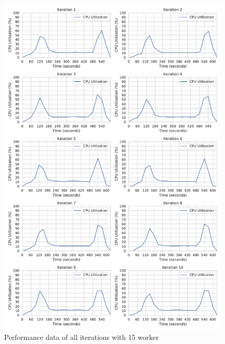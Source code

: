 \begin{figure}[h]
\centering
\includegraphics[scale=0.4]{images/07_evaluation/classification/15_worker_cpu_performance}
\caption{Performance data of all iterations with 15 worker}
\label{fig:appendix_eval_classification_static15}
\end{figure}


